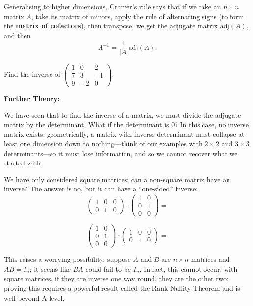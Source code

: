 \documentclass{article}
\begin{document}
Generalising to higher dimensions, Cramer's rule says that if we take an $n\times n$ matrix $A$, take its matrix of minors, apply the rule of alternating signs (to form the \textbf{matrix of cofactors}), then transpose, we get the adjugate matrix $\mathrm{adj}(A)$, and then
\[A^{-1}=\frac{1}{|A|}\mathrm{adj}(A).\]\bigskip

Find the inverse of $\left(\begin{array}{ccc}1&0&2\\7&3&-1\\9&-2&0\end{array}\right)$.

\clearpage


\textbf{Further Theory:}\bigskip


We have seen that to find the inverse of a matrix, we must divide the adjugate matrix by the determinant. What if the determinant is 0? In this case, no inverse matrix exists; geometrically, a matrix with inverse determinant must collapse at least one dimension down to nothing---think of our examples with $2\times 2$ and $3\times 3$ determinants---so it must lose information, and so we cannot recover what we started with.\bigskip

We have only considered square matrices; can a non-square matrix have an inverse? The answer is no, but it can have a ``one-sided'' inverse:
\[\left(\begin{array}{ccc} 1 & 0 & 0\\ 0 & 1 & 0\end{array}\right)\cdot \left(\begin{array}{cc} 1 & 0\\ 0 & 1\\ 0 & 0\end{array}\right)=\]

\[\left(\begin{array}{cc} 1 & 0\\ 0 & 1\\ 0 & 0\end{array}\right)\cdot \left(\begin{array}{ccc} 1 & 0 & 0\\ 0 & 1 & 0\end{array}\right)=\]

This raises a worrying possibility: suppose $A$ and $B$ are $n\times n$ matrices and $AB=I_n$; it seems like $BA$ could fail to be $I_n$. In fact, this cannot occur: with square matrices, if they are inverse one way round, they are the other two; proving this requires a powerful result called the Rank-Nullity Theorem and is well beyond A-level.
\end{document}
